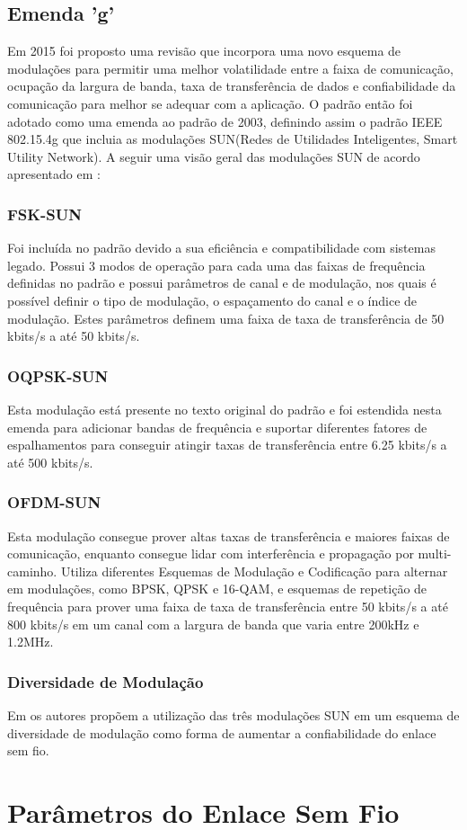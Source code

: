 \subsection*{Emenda 'g'}
Em 2015 foi proposto uma revisão que incorpora uma novo esquema de modulações para permitir uma melhor volatilidade entre a faixa de comunicação, ocupação da largura de banda, taxa de transferência de dados e confiabilidade da comunicação para melhor se adequar com a aplicação. O padrão então foi adotado como uma emenda ao padrão de 2003, definindo assim o padrão IEEE 802.15.4g que incluia as modulações SUN(Redes de Utilidades Inteligentes, Smart Utility Network)\cite{tuset2020reliability}.
A seguir uma visão geral das modulações SUN de acordo apresentado em \cite{tuset2020reliability}:
\subsubsection*{FSK-SUN}
Foi incluída no padrão devido a sua eficiência e compatibilidade com sistemas legado. Possui 3 modos de operação para cada uma das faixas de frequência definidas no padrão e possui parâmetros de canal e de modulação, nos quais é possível definir o tipo de modulação, o espaçamento do canal e o índice de modulação. Estes parâmetros definem uma faixa de taxa de transferência de 50 kbits/s a até 50 kbits/s.
\subsubsection*{OQPSK-SUN}
Esta modulação está presente no texto original do padrão e foi estendida nesta emenda para adicionar bandas de frequência e suportar diferentes fatores de espalhamentos para conseguir atingir taxas de transferência entre 6.25 kbits/s a até 500 kbits/s.
\subsubsection*{OFDM-SUN}
Esta modulação consegue prover altas taxas de transferência e maiores faixas de comunicação, enquanto consegue lidar com interferência e propagação por multi-caminho. Utiliza diferentes Esquemas de Modulação e Codificação para alternar em modulações, como BPSK, QPSK e 16-QAM, e esquemas de repetição de frequência para prover uma faixa de taxa de transferência entre 50 kbits/s a até 800 kbits/s em um canal com a largura de banda que varia entre 200kHz e 1.2MHz.

\subsubsection*{Diversidade de Modulação}
Em \cite{gomes2020improving} os autores propõem a utilização das três modulações SUN em um esquema de diversidade de modulação como forma de aumentar a confiabilidade do enlace sem fio.

\section{Parâmetros do Enlace Sem Fio}
\label{paramSF}


